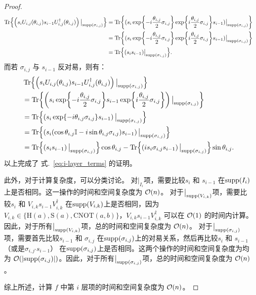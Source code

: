 \begin{proposition}
\begin{proof}
    \begin{equation}
      \begin{aligned}
      \Tr{\left(s_i U_{i,j}(\theta_{i,j}) s_{i-1} U_{i,j}^\dagger(\theta_{i,j})\right)\big|_{\text{supp} \left( \sigma_{i,j} \right)}}
      &=\Tr{(s_i \exp{-i \frac{\theta_{i,j}}{2}\sigma_{i,j} }  \exp{i \frac{\theta_{i,j}}{2}\sigma_{i,j} }s_{i-1}) \big|_{\text{supp} \left( \sigma_{i,j} \right)}}\\
      &=\Tr{(s_i \exp{-i \frac{\theta_{i,j}}{2}\sigma_{i,j} } \exp{i \frac{\theta_{i,j}}{2}\sigma_{i,j} }s_{i-1}) \big|_{{\text{supp} \left( \sigma_{i,j} \right)}}}\\
      &=\Tr{(s_i s_{i-1})\big|_{{\text{supp} \left( \sigma_{i,j} \right)}}}.
    \end{aligned}
    \end{equation}
    而若 $\sigma_{i,j}$ 与 $s_{i-1}$ 反对易，则有：
    \begin{equation}
      \begin{aligned}
      &\Tr{\left(s_i U_{i,j}(\theta_{i,j}) s_{i-1} U_{i,j}^\dagger(\theta_{i,j})\right)\big|_{\text{supp} \left( \sigma_{i,j} \right)}}\\
      &=\Tr{ \left(s_i\exp{-i \frac{\theta_{i,j}}{2}\sigma_{i,j} } s_{i-1}\exp{i \frac{\theta_{i,j}}{2}\sigma_{i,j}}\right) \big|_{\text{supp} \left( \sigma_{i,j} \right)}}\\
      &=\Tr{\left( s_i  \exp{-i\theta_{i,j}\sigma_{i,j}} s_{i-1}\right) \big|_{\text{supp} \left( \sigma_{i,j} \right)}}\\
      &=\Tr{ \left(s_i (\cos{\theta_{i,j}}\mathbb{I}-i\sin{\theta_{i,j}}\sigma_{i,j}) s_{i-1} \right) \big|_{\text{supp} \left( \sigma_{i,j} \right)}}\\
      &=\Tr{\left(s_i s_{i-1}\right)\big|_{\text{supp} \left( \sigma_{i,j} \right)}}\cos{\theta_{i,j}}-\Tr{\left(i s_i \sigma_{i,j}s_{i-1}\right)\big|_{\text{supp} \left( \sigma_{i,j} \right)}}\sin{\theta_{i,j}}.
    \end{aligned}
    \end{equation}
    以上完成了 式.~\eqref{eq:i-layer_terms} 的证明。

    此外，对于计算复杂度，可以分类讨论。
    对$\big|_{I_i}$项，需要比较$s_i$ 和 $s_{i-1}$ 在$\text{supp}(I_i)$上是否相同。这一操作的时间和空间复杂度为 $\order{n}$。
    对于$\big|_{\text{supp} \left( V_{i,k} \right)}$项，需要比较$s_i$ 和 $V_{i,k}s_{i-1}V_{i,k}^\dagger$ 在$\text{supp}(V_{i,k})$上是否相同，因为 $V_{i,k}\in\{\mathrm{H}(a),\mathrm{S}(a),\mathrm{CNOT}(a,b)\}$，$V_{i,k}s_{i-1}V_{i,k}^\dagger$ 可以在 $\order{1}$ 的时间内计算。因此，对于所有$\big|_{\text{supp} \left( V_{i,k} \right)}$项，总的时间和空间复杂度为 $\order{n}$。
    对于$\big|_{\text{supp} \left( \sigma_{i,j} \right)}$项，需要首先比较$s_{i-1}$ 和 $\sigma_{i,j}$ 在$\text{supp}(\sigma_{i,j})$上的对易关系，然后再比较$s_i$ 和 $s_{i-1}$（或是$\sigma_{i,j'}s_{i-1}$） 在$\text{supp}(\sigma_{i,j})$上是否相同。这两个操作的时间和空间复杂度为均为 $\order{\abs{\supp(\sigma_{i,j})}}$。因此，对于所有$\big|_{\text{supp} \left( \sigma_{i,j} \right)}$项，总的时间和空间复杂度为 $\order{n}$。

    综上所述，计算 $f$ 中第 $i$ 层项的时间和空间复杂度为 $\order{n}$。
    \end{proof}
\end{proposition}

